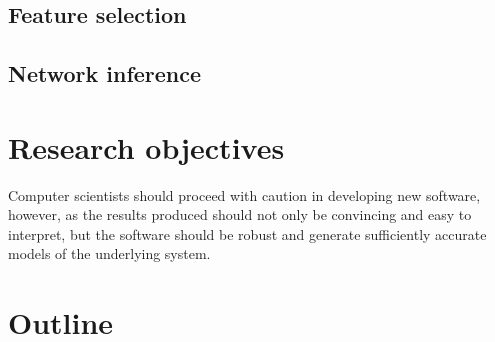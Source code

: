 \subsection{Feature selection}

\subsection{Network inference}

\section{Research objectives}
Computer scientists should proceed with caution in developing new software, however, as the results produced should not only be convincing and easy to interpret, but the software should be robust and generate sufficiently accurate models of the underlying system.

\section{Outline} %